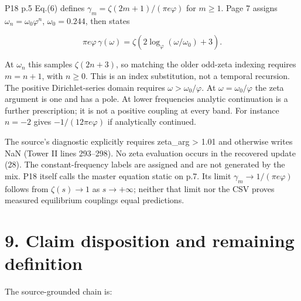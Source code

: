 \documentclass[11pt,a4paper]{article}
\begin{document}
P18 p.5 Eq.(6) defines $\gamma_m=\zeta(2m+1)/(\pi e\varphi)$ for $m\geq1$. Page 7 assigns $\omega_n=\omega_0\varphi^n$, $\omega_0=0.244$, then states


\[
\pi e\varphi\,\gamma(\omega)
=\zeta\!\left(2\log_\varphi(\omega/\omega_0)+3\right). \tag{29}
\]

At $\omega_n$ this samples $\zeta(2n+3)$, so matching the older odd-zeta indexing requires \textbf{$m=n+1$}, with $n\geq0$. This is an index substitution, not a temporal recursion. The positive Dirichlet-series domain requires $\omega>\omega_0/\varphi$. At $\omega=\omega_0/\varphi$ the zeta argument is one and has a pole. At lower frequencies analytic continuation is a further prescription; it is not a positive coupling at every band. For instance $n=-2$ gives $-\!1/(12\pi e\varphi)$ if analytically continued.


The source's diagnostic explicitly requires zeta\_\allowbreak{}arg > 1.01 and otherwise writes NaN (Tower II lines 293--298). No zeta evaluation occurs in the recovered update (28). The constant-frequency labels are assigned and are not generated by the mix. P18 itself calls the master equation static on p.7. Its limit $\gamma_m\to1/(\pi e\varphi)$ follows from $\zeta(s)\to1$ as $s\to+\infty$; neither that limit nor the CSV proves measured equilibrium couplings equal predictions.


\clearpage
\section*{9. Claim disposition and remaining definition}

The source-grounded chain is:
\end{document}
